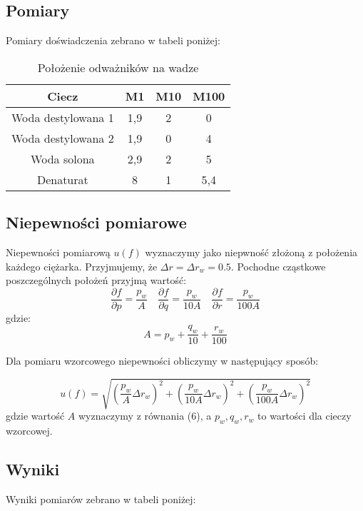 \documentclass{article} %
\begin{document}
\subsection{Pomiary}

Pomiary doświadczenia zebrano w tabeli poniżej:

\begin{table}[h!]
\centering
\begin{tabular}{|c|c|c|c|}
\hline
\textbf{Ciecz} & \textbf{M1} & \textbf{M10} & \textbf{M100} \\
\hline
Woda destylowana 1 & 1,9 & 2 & 0 \\
Woda destylowana 2 & 1,9 & 0 & 4 \\
Woda solona & 2,9 & 2 & 5 \\
Denaturat & 8 & 1 & 5,4 \\
\hline
\end{tabular}
\caption{Położenie odważników na wadze}
\label{table:students}
\end{table}

\subsection{Niepewności pomiarowe}

Niepewności pomiarową $u(f)$ wyznaczymy jako niepwność złożoną z położenia każdego ciężarka. Przyjmujemy, że $\Delta r = \Delta r_w = 0.5$. Pochodne cząstkowe poszczególnych położeń przyjmą wartość:
{\
    \begin{equation}
        \frac{\partial f}{\partial p} = \frac{p_w}{A}
        \quad\frac{\partial f}{\partial q} = \frac{p_w}{10A}
        \quad\frac{\partial f}{\partial r} = \frac{p_w}{100A}
    \end{equation}
}
gdzie:
{\
    \begin{equation}
        A = p_w + \frac{q_w}{10} + \frac{r_w}{100}
    \end{equation}
}

Dla pomiaru wzorcowego niepewności obliczymy w następujący sposób:

{\large
    \begin{equation}
        u(f) = \sqrt{(\frac{p_w}{A}\Delta r_w)^2+(\frac{p_w}{10A}\Delta r_w)^2+(\frac{p_w}{100A}\Delta r_w)^2}
    \end{equation}
}
gdzie wartość $A$ wyznaczymy z równania (6), a $p_w, q_w, r_w$ to wartości dla cieczy wzorcowej.
\subsection{Wyniki}
Wyniki pomiarów zebrano w tabeli poniżej:
\end{document}
